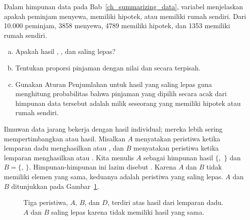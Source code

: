 \begin{exercisewrap}
\begin{nexercise}
Dalam himpunan data  pada Bab~\ref{ch_summarizing_data},
variabel  menjelaskan apakah peminjam
menyewa, memiliki hipotek, atau memiliki rumah sendiri.
Dari 10.000 peminjam, 3858 menyewa, 4789 memiliki hipotek,
dan 1353 memiliki rumah sendiri.\footnotemark{}
\begin{enumerate}[(a)]
\setlength{\itemsep}{0mm}
\item
    Apakah hasil , ,
    dan  saling lepas?
\item
    Tentukan proporsi pinjaman dengan nilai 
    dan  secara terpisah.
\item
    Gunakan Aturan Penjumlahan untuk hasil yang saling lepas
    guna menghitung probabilitas bahwa pinjaman yang dipilih
    secara acak dari himpunan data tersebut adalah milik seseorang
    yang memiliki hipotek atau rumah sendiri.
\end{enumerate}
\end{nexercise}
\end{exercisewrap}


Ilmuwan data jarang bekerja dengan hasil individual; mereka lebih sering mempertimbangkan  atau  hasil. Misalkan $A$ menyatakan peristiwa ketika lemparan dadu menghasilkan  atau , dan $B$ menyatakan peristiwa ketika lemparan menghasilkan  atau . Kita menulis $A$ sebagai himpunan hasil $\{$,~$\}$ dan $B=\{$, $\}$. Himpunan-himpunan ini lazim disebut . Karena $A$ dan $B$ tidak memiliki elemen yang sama, keduanya adalah peristiwa yang saling lepas. $A$ dan $B$ ditunjukkan pada Gambar~\ref{disjointSets}.

\begin{figure}[hhh]
  \centering
  \caption{Tiga peristiwa, $A$, $B$, dan $D$, terdiri atas
      hasil dari lemparan dadu.
      $A$ dan $B$ saling lepas karena tidak memiliki
      hasil yang sama.}
  \label{disjointSets}
\end{figure}

